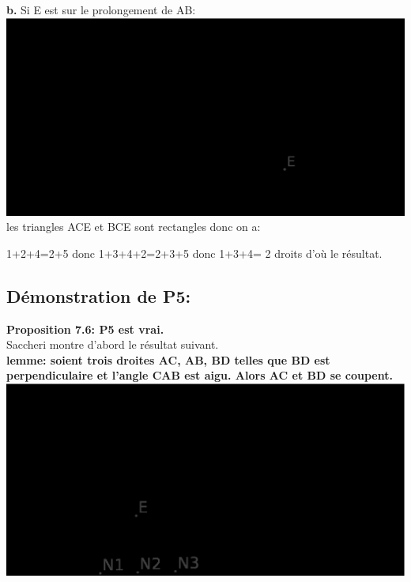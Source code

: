 \documentclass[a4paper, 12pt, twoside]{book}
\begin{document}
 \textbf{b.}  Si E est sur le prolongement de AB:\\
 
 \includegraphics[scale=0.5]{figures/saccheri1quater.eps}\\ 
 
 les triangles ACE et BCE sont rectangles donc on a:\
 
 1+2+4=2+5 donc 1+3+4+2=2+3+5 donc 1+3+4= 2 droits d'où le résultat.\\
 
 
 

 
 \subsection{Démonstration de P5:}
 
 
  
  \textbf{Proposition 7.6: P5 est vrai.}\\
  
  Saccheri montre d'abord le résultat suivant.\\

  
 \textbf{lemme: soient trois droites AC, AB, BD telles que BD est perpendiculaire et l'angle CAB est aigu. Alors AC et BD se coupent.} \\
 
 
\includegraphics[scale=0.7]{figures/sccH1a.eps} \\
 
\end{document}
